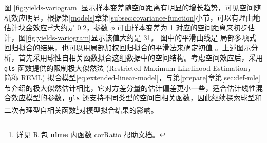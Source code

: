 \documentclass[12pt,a4paper,UTF8,twoside]{book}
\theoremstyle{definition}
\theoremstyle{definition}
\theoremstyle{definition}
\theoremstyle{remark}
\begin{document}
图 \ref{fig:yields-variogram}
显示样本变差随空间距离有明显的增长趋势，可见空间随机效应明显，根据第\ref{models}章第\ref{subsec:covariance-function}小节，可以有理由地估计块金效应\(\tau^2\)大约是
0.2，参数 \(\phi\) 可由样本变差为 1
对应的空间距离来初步估计，图\ref{fig:yields-variogram}显示该值大约是
31。 图中的平滑曲线是
局部多项式回归拟合的结果，也可以用局部加权回归拟合的平滑法来确定初值
\citep{Xie2008COS}。上述图示分析，首先采用球性自相关函数拟合这组数据中的空间结构。考虑空间效应后，采用
\texttt{gls} 函数提供的限制极大似然法 (Restricted Maximum Likelihood
Estimation， 简称 REML)
拟合模型\eqref{eq:extended-linear-model}，与第\ref{prepare}章第\ref{sec:def-mle}节介绍的极大似然估计相比，它对方差分量的估计偏差更小一些\citep{Diggle2007}，适合估计线性混合效应模型的参数，\texttt{gls}
还支持不同类型的空间自相关函数，因此继续探索球型和二次有理型自相关函数\footnote{详见 R 包 \textbf{nlme} 内函数 corRatio 帮助文档。}对模型拟合结果的影响。
\end{document}
